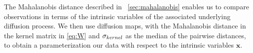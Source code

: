 The Mahalanobis distance described in \sec~\ref{sec:mahalanobis} enables us to compare observations in terms of the intrinsic variables of the associated underlying diffusion process.
%
We then use diffusion maps, with the Mahalanobis distance in the kernel matrix in \eqref{eq:W} and $\sigma_{kernel}$ as the median of the pairwise distances, to obtain a parameterization our data with respect to the intrinsic variables $\mathbf{x}$.
%
%
%
